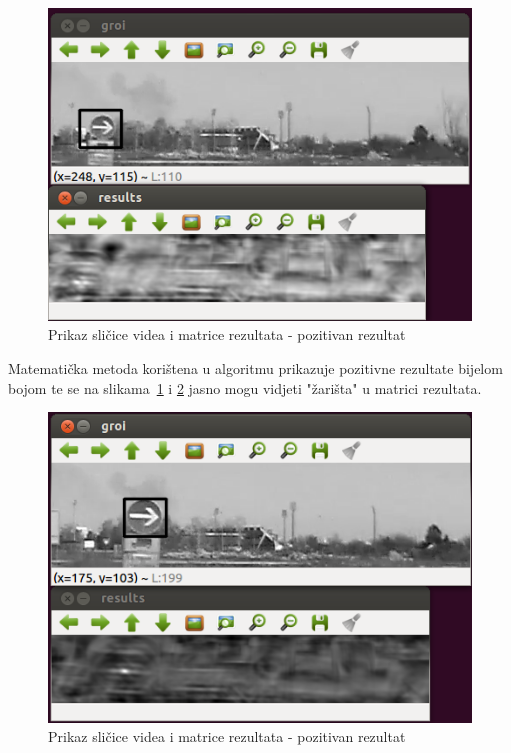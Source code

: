 \begin{figure}[h]
\centering
\includegraphics[scale=0.5]{figures/04.png}
\caption{Prikaz sličice videa i matrice rezultata - pozitivan rezultat}
\label{fig:04.png}
\end{figure}

Matematička metoda korištena u algoritmu prikazuje pozitivne rezultate
bijelom bojom te se na slikama~\ref{fig:04.png} i \ref{fig:05.png} jasno
mogu vidjeti "žarišta" u matrici rezultata.

\begin{figure}[h]
\centering
\includegraphics[scale=0.5]{figures/05.png}
\caption{Prikaz sličice videa i matrice rezultata - pozitivan rezultat}
\label{fig:05.png}
\end{figure}

